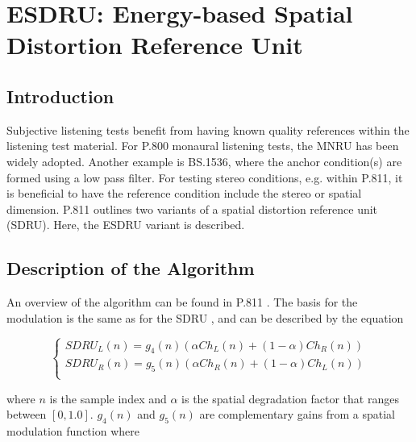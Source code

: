 
\chapter{ESDRU: Energy-based Spatial Distortion Reference Unit}

\section{Introduction}

Subjective listening tests benefit from having known quality references within
the listening test material. For P.800 monaural listening tests, the MNRU has
been widely adopted. Another example is BS.1536, where the anchor condition(s)
are formed using a low pass filter. For testing stereo conditions, e.g. within
P.811, it is beneficial to have the reference condition include the stereo or 
spatial dimension. P.811 outlines two variants of a spatial distortion reference
unit (SDRU). Here, the ESDRU variant is described.



\section{Description of the Algorithm}

An overview of the algorithm can be found in P.811 \cite{P.811}. The basis for
the modulation is the same as for the SDRU \cite{SDRU}, and can be described by
the equation

  \[
    \left\{
       \begin{array}{ll}
         {SDRU}_L(n) = g_4(n) \left( \alpha Ch_L(n)+(1-\alpha)Ch_R(n) \right) \\
         {SDRU}_R(n) = g_5(n) \left( \alpha Ch_R(n)+(1-\alpha)Ch_L(n) \right) \\
       \end{array}
     \right.
  \]

where $n$ is the sample index and $\alpha$ is the spatial degradation factor that
ranges between $[0,1.0]$. $g_4(n)$ and $g_5(n)$ are complementary gains from a
spatial modulation function where
 
